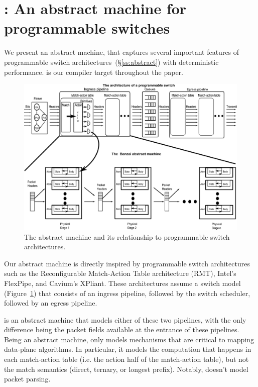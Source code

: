 \section{\absmachine: An abstract machine for programmable switches}
\label{s:absmachine}

We present an abstract machine, \textit{\absmachine} that captures several
important features of programmable switch architectures~(\S\ref{ss:abstract})
with deterministic performance. \absmachine is our compiler target throughout
the paper.

\begin{figure}[!t]
  \includegraphics[width=\textwidth]{banzai.pdf}
  \caption{The \absmachine abstract machine and its relationship to programmable switch architectures.}
  \label{fig:switch}
\end{figure}
Our abstract machine is directly inspired by programmable switch architectures
such as the Reconfigurable Match-Action Table architecture (RMT), Intel's
FlexPipe, and Cavium's XPliant. These architectures assume a switch model
(Figure~\ref{fig:switch}) that consists of an ingress pipeline, followed by the
switch scheduler, followed by an egress pipeline.

\absmachine is an abstract machine that models either of these two pipelines,
with the only difference being the packet fields available at the entrance of
these pipelines. Being an abstract machine, \absmachine only models mechanisms
that are critical to mapping data-plane algorithms. In particular, it models
the computation that happens in each match-action table (i.e. the action half
of the match-action table), but not the match semantics (direct, ternary, or
longest prefix). Notably, \absmachine doesn't model packet parsing.

